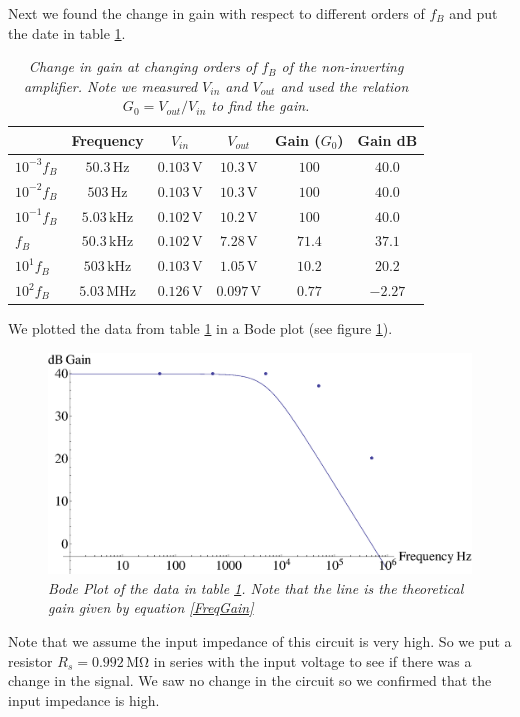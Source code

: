 \documentclass[11pt]{article}
\numberwithin{equation}{section}
\numberwithin{figure}{section}
\numberwithin{table}{section}
\newcommand{\unit}[1]{\ensuremath{\, \mathrm{#1}}}
\begin{document}
Next we found the change in gain with respect to different orders of $f_B$ and put the date in table \ref{2parta}.

\begin{table}[h]
\centering
\begin{tabular}{lccccc}
		&Frequency		&$V_{in}$	&$V_{out}$		&Gain ($G_0$)	&Gain dB\\
\hline
$10^{-3}f_B$	&$50.3\unit{Hz}$	&$0.103\unit{V}$	&$10.3\unit{V}$		&$100$	&$40.0$\\
$10^{-2}f_B$	&$503\unit{Hz}$		&$0.103\unit{V}$	&$10.3\unit{V}$		&$100$	&$40.0$\\
$10^{-1}f_B$	&$5.03\unit{kHz}$	&$0.102\unit{V}$	&$10.2\unit{V}$		&$100$	&$40.0$\\
$f_B$		&$50.3\unit{kHz}$	&$0.102\unit{V}$	&$7.28\unit{V}$		&$71.4$	&$37.1$\\
$10^{1}f_B$	&$503\unit{kHz}$	&$0.103\unit{V}$	&$1.05\unit{V}$		&$10.2$	&$20.2$\\
$10^{2}f_B$	&$5.03\unit{MHz}$	&$0.126\unit{V}$	&$0.097\unit{V}$	&$0.77$	&$-2.27$
\end{tabular}
\caption{\textit{Change in gain at changing orders of $f_B$ of the non-inverting amplifier. Note we measured $V_{in}$ and $V_{out}$ and used the relation $G_0 = V_{out}/V_{in}$ to find the gain.}}
\label{2parta}
\end{table}
We plotted the data from table \ref{2parta} in a Bode plot (see figure \ref{PlotNonInvAmp}).

\begin{figure}[h]
\centering
\includegraphics[scale=0.60]{PlotNonInvAmp.eps}
\caption{\textit{Bode Plot of the data in table \ref{2parta}. Note that the line is the theoretical gain given by equation \ref{FreqGain}}}
\label{PlotNonInvAmp}
\end{figure}

Note that we assume the input impedance of this circuit is very high. So we put a resistor $R_s=0.992\unit{M\Omega}$ in series with the input voltage to see if there was a change in the signal. We saw no change in the circuit so we confirmed that the input impedance is high.
\end{document}
